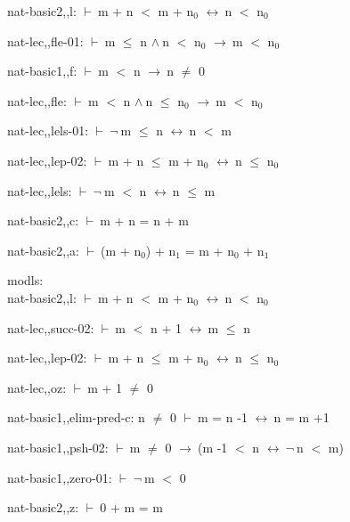 \documentclass[a4paper]{article}
\newcommand{\Fol}{\mbox{$\vdash\ $}}
\newcommand{\Not}{\mbox{$\neg\ $}}
\newcommand{\And}{\mbox{$\wedge\ $}}
\newcommand{\Imp}{\mbox{$\rightarrow\ $}}
\newcommand{\Equiv}{\mbox{$\leftrightarrow\ $}}
\begin{document}
nat-basic2,,l: 
 \Fol m + n $<$ m + $\mbox{n}_{0}$ \Equiv n $<$ $\mbox{n}_{0}$



nat-lec,,fle-01: 
 \Fol m $\le$ n \And n $<$ $\mbox{n}_{0}$ \Imp m $<$ $\mbox{n}_{0}$



nat-basic1,,f: 
 \Fol m $<$ n \Imp n $\neq$ 0



nat-lec,,fle: 
 \Fol m $<$ n \And n $\le$ $\mbox{n}_{0}$ \Imp m $<$ $\mbox{n}_{0}$



nat-lec,,lels-01: 
 \Fol \Not m $\le$ n \Equiv n $<$ m



nat-lec,,lep-02: 
 \Fol m + n $\le$ m + $\mbox{n}_{0}$ \Equiv n $\le$ $\mbox{n}_{0}$



nat-lec,,lels: 
 \Fol \Not m $<$ n \Equiv n $\le$ m



nat-basic2,,c: 
 \Fol m + n = n + m



nat-basic2,,a: 
 \Fol (m + $\mbox{n}_{0}$) + $\mbox{n}_{1}$ = m + $\mbox{n}_{0}$ + $\mbox{n}_{1}$



\bigskip

modls:\\ nat-basic2,,l: 
 \Fol m + n $<$ m + $\mbox{n}_{0}$ \Equiv n $<$ $\mbox{n}_{0}$



nat-lec,,succ-02: 
 \Fol m $<$ n + 1 \Equiv m $\le$ n



nat-lec,,lep-02: 
 \Fol m + n $\le$ m + $\mbox{n}_{0}$ \Equiv n $\le$ $\mbox{n}_{0}$



nat-lec,,oz: 
 \Fol m + 1 $\neq$ 0



nat-basic1,,elim-pred-c: 
n $\neq$ 0
 \Fol m = n -1 \Equiv n = m +1



nat-basic1,,psh-02: 
 \Fol m $\neq$ 0 \Imp (m -1 $<$ n \Equiv \Not n $<$ m)



nat-basic1,,zero-01: 
 \Fol \Not m $<$ 0



nat-basic2,,z: 
 \Fol 0 + m = m
\end{document}
